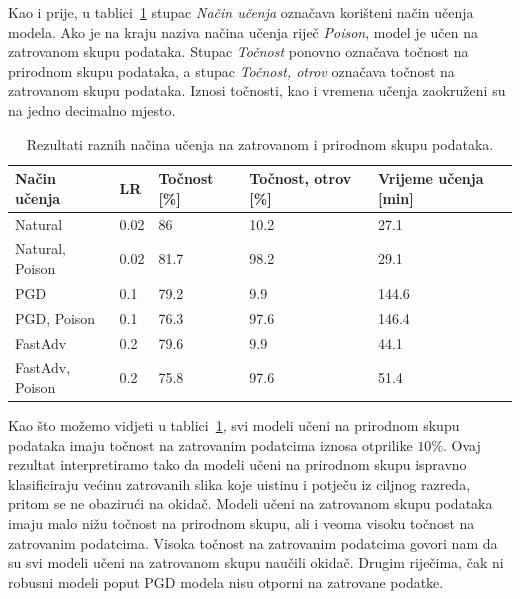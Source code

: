 \documentclass[times, utf8, zavrsni, numeric]{fer}
\begin{document}
Kao i prije, u tablici~\ref{tbl:mjerenja_robusno_ucenje_zatrovano} stupac \textit{Način učenja} označava korišteni način učenja modela. Ako je na kraju naziva načina učenja 
riječ \textit{Poison}, model je učen na zatrovanom skupu podataka. Stupac \textit{Točnost} ponovno označava točnost na prirodnom skupu podataka, a stupac \textit{Točnost, otrov}
označava točnost na zatrovanom skupu podataka. Iznosi točnosti, kao i vremena učenja zaokruženi su na jedno decimalno mjesto.

\begin{table}[htb]
    \caption{Rezultati raznih načina učenja na zatrovanom i prirodnom skupu podataka.}
    \label{tbl:mjerenja_robusno_ucenje_zatrovano}
    \centering
    \begin{tabular}{lllll} \hline
    Način učenja & LR & Točnost [\%] & Točnost, otrov [\%] & Vrijeme učenja [min]\\ \hline
    Natural & 0.02 & 86 & 10.2 & 27.1 \\
    Natural, Poison & 0.02 & 81.7 & 98.2 & 29.1 \\
    PGD & 0.1 & 79.2 & 9.9 & 144.6 \\
    PGD, Poison & 0.1 & 76.3 & 97.6 & 146.4 \\
    FastAdv & 0.2 & 79.6 & 9.9 & 44.1 \\
    FastAdv, Poison & 0.2 & 75.8 & 97.6 & 51.4 \\ \hline
    \end{tabular}
\end{table}

Kao što možemo vidjeti u tablici~\ref{tbl:mjerenja_robusno_ucenje_zatrovano}, svi modeli učeni na prirodnom skupu podataka imaju točnost na zatrovanim podatcima iznosa otprilike $10\%$.
Ovaj rezultat interpretiramo tako da modeli učeni na prirodnom skupu ispravno klasificiraju većinu zatrovanih slika koje uistinu i potječu iz ciljnog razreda, pritom se ne obazirući na okidač.
Modeli učeni na zatrovanom skupu podataka imaju malo nižu točnost na prirodnom skupu, ali i veoma visoku točnost na zatrovanim podatcima. 
Visoka točnost na zatrovanim podatcima govori nam da su svi modeli učeni na zatrovanom skupu naučili okidač. 
Drugim riječima, čak ni robusni modeli poput PGD modela nisu otporni na zatrovane podatke.

\pagebreak
\end{document}
